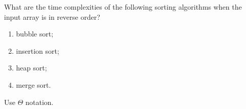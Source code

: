 What are the time complexities of the following sorting algorithms when
the input array is in reverse order?

\begin{enumerate}

\item  bubble sort;

\item  insertion sort;

\item  heap sort;

\item  merge sort.

\end{enumerate}
\medskip
Use $\Theta$  notation.
